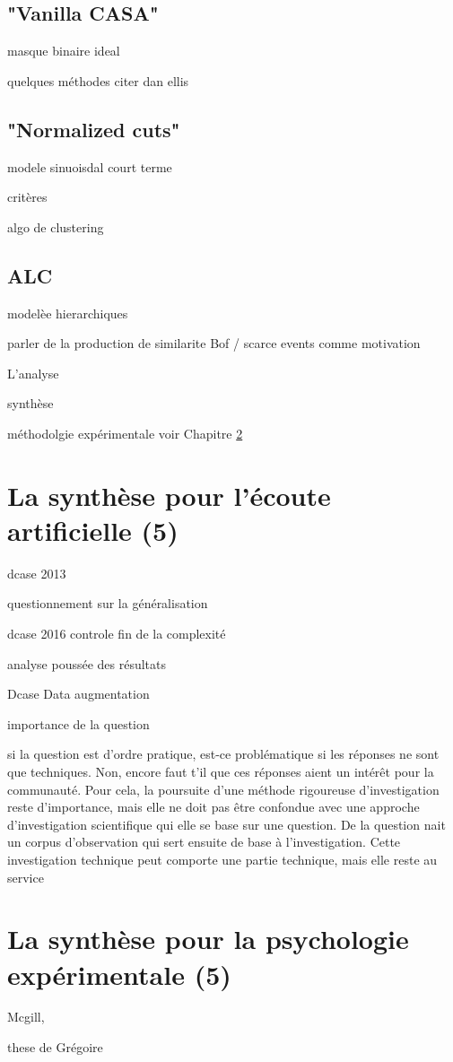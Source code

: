 \subsection{"Vanilla CASA"}

masque binaire ideal

quelques méthodes citer dan ellis

\subsection{"Normalized cuts"}

modele sinuoisdal court terme

critères

algo de clustering

\cite{lagrangeTaslp08}

\subsection{ALC}

modelèe hierarchiques

\cite{rossignol:hal-01122006}

parler de la production de similarite Bof / scarce events comme motivation


L'analyse

synthèse

méthodolgie expérimentale voir Chapitre \ref{}

\section{La synthèse pour l'écoute artificielle (5)}

dcase 2013 \cite{stowellhal-01253912}

questionnement sur la généralisation \cite{lafayhal-01111381}

dcase 2016 controle fin de la complexité

analyse poussée des résultats

Dcase  \cite{mesa} Data augmentation

importance de la question

si la question est d'ordre pratique, est-ce problématique si les réponses ne sont que techniques. Non, encore faut t'il que ces réponses aient un intérêt pour la communauté. Pour cela, la poursuite d'une méthode rigoureuse d'investigation reste d'importance, mais elle ne doit pas être confondue avec une approche d'investigation scientifique qui elle se base sur une question. De la question nait un corpus d'observation qui sert ensuite de base à l'investigation. Cette investigation technique peut comporte une partie technique, mais elle reste au service

\section{La synthèse pour la psychologie expérimentale (5)}

Mcgill, \cite{LagrangeTasslp10}

\cite{Murphy11a}

these de Grégoire \cite{lafayhal-01300399}
